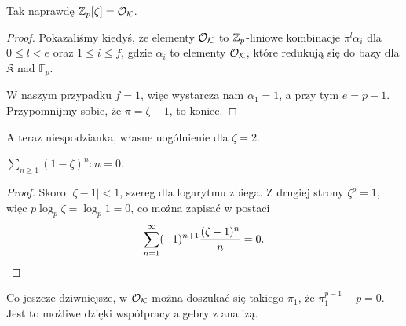 \begin{fakt}
	Tak naprawdę $\mathbb Z_p[\zeta] = \mathcal O_{\mathcal K}$.
\end{fakt}

\begin{proof}
	Pokazaliśmy kiedyś, że elementy $\mathcal O_{\mathcal K}$ to $\mathbb Z_p$-liniowe kombinacje $\pi^{l}\alpha_i$ dla $0 \le l < e$ oraz $1 \le i \le f$, gdzie $\alpha_i$ to elementy $\mathcal O_{\mathcal K}$, które redukują się do bazy dla $\mathfrak K$ nad $\mathbb F_p$.

	W naszym przypadku $f = 1$, więc wystarcza nam $\alpha_1 = 1$, a przy tym $e = p-1$.
	Przypomnijmy sobie, że $\pi = \zeta - 1$, to koniec.
\end{proof}

A teraz niespodzianka, własne uogólnienie dla $\zeta = 2$.

\begin{fakt}
	$\sum_{n \ge 1} (1 - \zeta)^n : n = 0$.
\end{fakt}

\begin{proof}
	Skoro $|\zeta - 1| < 1$, szereg dla logarytmu zbiega.
	Z drugiej strony $\zeta^p = 1$, więc $p \log_p \zeta = \log_p 1 = 0$, co można zapisać w postaci
	\[
		\sum_{n = 1}^\infty (-1)^{n+1} \frac{(\zeta - 1)^n} n = 0. \qedhere
	\]
\end{proof}

Co jeszcze dziwniejsze, w $\mathcal O_{\mathcal K}$ można doszukać się takiego $\pi_1$, że $\pi_1^{p - 1} + p = 0$.
Jest to możliwe dzięki współpracy algebry z analizą.